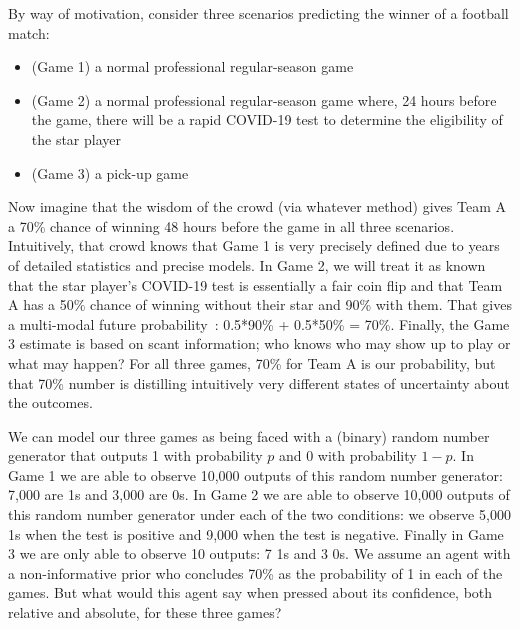 \documentclass[sigconf,anonymous]{aamas}   %
\newcommand{\rupert}[1]{\ifnum\Chatty=1 \textcolor{red}   {Rupert: [#1]} \fi}
\newcommand{\dpenn} [1]{\ifnum\Chatty=1 \textcolor{blue}  {dpenn:  [#1]} \fi}
\newcommand{\dreev} [1]{\ifnum\Chatty=1 \textcolor{purple}{dreev:  [#1]} \fi}
\begin{document}
By way of motivation, consider three scenarios predicting the winner of a football match:
\begin{itemize}
\item (Game 1) a normal professional regular-season game 
\item (Game 2) a normal professional regular-season game where, 24 hours before the game, there will be a rapid COVID-19 test to determine the eligibility of the star player 
\item (Game 3) a pick-up game
\end{itemize}
Now imagine that the wisdom of the crowd (via whatever method) gives Team A a 70\% chance of winning 48 hours before the game in all three scenarios. 
Intuitively, that crowd knows that Game 1 is very precisely defined due to years of detailed statistics and precise models.
In Game 2, we will treat it as known that the star player's COVID-19 test is essentially a fair coin flip and that Team A has a 50\% chance of winning without their star and 90\% with them.
That gives a multi-modal future probability~\cite{pearl1987}: %
0.5*90\% + 0.5*50\% = 70\%.
Finally, the Game 3 estimate is based on scant information; %
who knows who may show up to play or what may happen?
For all three games, 70\% for Team A is our probability, but that 
70\% 
number is distilling intuitively very different states of uncertainty about the 
outcomes.

We can model our three games as being faced with a (binary) random number generator that outputs 1 with probability $p$ and 0 with probability $1-p$. 
In Game 1 we are able to observe 10,000 outputs of this random number generator: 
7,000 are 1s and 3,000 are 0s. 
In Game 2 we are able to observe 10,000 outputs of this random number generator under each of the two conditions: we observe 5,000 1s when the test is positive and 9,000 when the test is negative.
Finally in Game 3 we are only able to observe 10 outputs: 7 1s and 3 0s. 
We assume an %
agent with a non-informative prior who concludes 70\% as the probability of 1 in each of the games. %
But what would this agent say when pressed about its confidence, both relative and absolute, for these three games?
\end{document}
